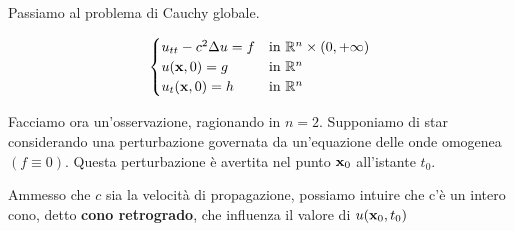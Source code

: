 Passiamo al problema di Cauchy globale.

\begin{equation}
    \begin{cases}
        u_{tt} -c^{2} \Delta u=f & \text{in} \ \mathbb{R}^{n} \times (0,+\infty) \\
        u(\x ,0) =g              & \text{in} \ \mathbb{R}^{n}                    \\
        u_{t}(\x ,0) =h          & \text{in} \ \mathbb{R}^{n}
    \end{cases}
    \label{eq:pcg-onde-unicita}
\end{equation}

Facciamo ora un'osservazione, ragionando in $n=2$. Supponiamo di star considerando una perturbazione governata da un'equazione delle onde omogenea $(f\equiv 0)$. Questa perturbazione è avertita nel punto $\mathbf{x}_{0}$ all'istante $t_{0}$.

Ammesso che $c$ sia la velocità di propagazione, possiamo intuire che c'è un intero cono, detto \textbf{cono retrogrado}, che influenza il valore di $u(\mathbf{x}_{0} ,t_{0})$


